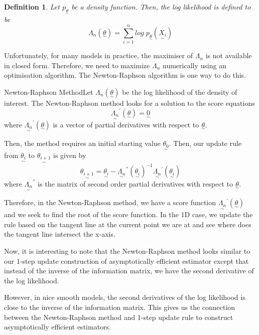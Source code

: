 \documentclass[twoside]{article}
\newtheorem{definition}[theorem]{Definition}
\newcommand{\utilde}{\underset{\sim}}
\begin{document}
\begin{definition}
Let $p_{\utilde{\theta}}$ be a density function. Then, the log likelihood is defined to be 
$$
\Lambda_n(\utilde{\theta}) = \sum_{i=1}^{n}log\;p_{\utilde{\theta}}(\utilde{X_i})
$$
\end{definition}

Unfortunately, for many models in practice, the maximiser of $\Lambda_n$ is not available in closed form. Therefore, we need to maximize  $\Lambda_n$ numerically using an optimisation algorithm. The Newton-Raphson algorithm is one way to do this.

\begin{proposition_exam}{Newton-Raphson Method}{}Let $\Lambda_n(\utilde{\theta})$ be the log likelihood of the density of interest. The Newton-Raphson method looks for a solution to the score equations 
$$
\utilde{\Lambda_n}^{'}(\utilde{\theta}) = \utilde{0}
$$
where $\utilde{\Lambda_n}^{'}(\utilde{\theta})$ is a vector of partial derivatives with respect to $\utilde{\theta}.$

Then, the method requires an initial starting value $\utilde{\theta_0}$. Then, our update rule from $\utilde{\theta_{i}}$ to $\utilde{\theta_{i+1}}$ is given by 
$$
\utilde{\theta_{i+1}} = \utilde{\theta_{i}} - \utilde{\Lambda_{n}}^{''}(\utilde{\theta_i})^{-1}\utilde{\Lambda_{n}}^{'}(\utilde{\theta_{i}})
$$
where $\utilde{\Lambda_{n}}^{''}$ is the matrix of second order partial derivatives with respect to $\utilde{\theta}.$
\end{proposition_exam}

Therefore, in the Newton-Raphson method, we have a score function $\utilde{\Lambda_n}^{'}(\utilde{\theta})$ and we seek to find the root of the score function. In the 1D case, we update the rule based on the tangent line at the current point we are at and see where does the tangent line intersect the x-axis.

Now, it is interesting to note that the Newton-Raphson method looks similar to our 1-step update construction of asymptotically efficient estimator except that instead of the inverse of the information matrix, we have the second derivative of the log likelihood.

However, in nice smooth models, the second derivatives of the log likelihood is close to the inverse of the information matrix. This gives us the connection between the Newton-Raphson method and 1-step update rule to construct asymptotically efficient estimators.
\end{document}
